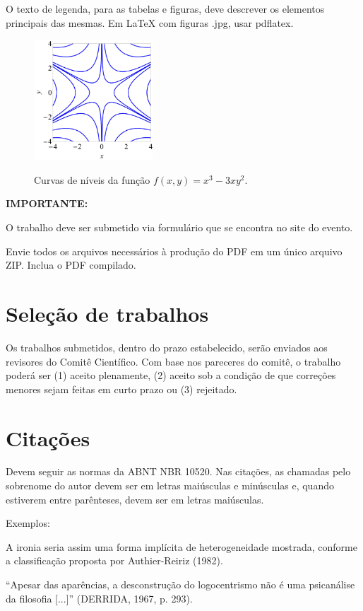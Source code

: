 \documentclass[a4paper,11pt]{article}
\begin{document}
{O texto de legenda, para as tabelas e figuras, deve descrever os elementos principais das mesmas. Em LaTeX com figuras .jpg, usar pdflatex.

\begin{figure}[h]
\centering \includegraphics[height=4.5cm]{fig.jpg}\\
\caption{{\small Curvas de níveis da função $f(x,y)=x^3-3 x y^2$. }}
\label{niveis}
\end{figure}

{\bf IMPORTANTE:

O trabalho deve ser submetido via formulário que se encontra no site do evento.

Envie todos os arquivos necessários à produção do PDF em um único arquivo ZIP. Inclua o PDF compilado.
}


\section*{Seleção de trabalhos}

Os trabalhos submetidos, dentro do prazo estabelecido, serão enviados aos revisores do Comitê Científico. Com base nos pareceres do comitê, o trabalho poderá ser (1) aceito plenamente, (2) aceito sob a condição de que correções menores sejam feitas em curto prazo ou (3) rejeitado.


\section*{Citações}
Devem seguir as normas da ABNT NBR 10520. Nas citações, as chamadas pelo sobrenome do autor devem ser em letras maiúsculas e minúsculas e, quando estiverem entre parênteses, devem ser em letras maiúsculas.

Exemplos:

A ironia seria assim uma forma implícita de heterogeneidade mostrada, conforme a classificação proposta por Authier-Reiriz (1982).

\vskip 0.2cm
``Apesar das aparências, a desconstrução do logocentrismo não é uma psicanálise da filosofia [...]'' (DERRIDA, 1967, p. 293).

}
\end{document}
